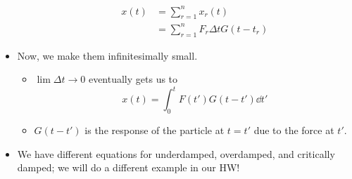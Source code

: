 \documentclass[../notes.tex]{subfiles}
\begin{document}
\begin{itemize}
\begin{itemize}
        \begin{align*}
            x(t) &= \sum_{r=1}^nx_r(t)\\
            &= \sum_{r=1}^nF_r\Delta tG(t-t_r)
        \end{align*}
    \end{itemize}
    \item Now, we make them infinitesimally small.
    \begin{itemize}
        \item $\lim\Delta t\to 0$ eventually gets us to
        \begin{equation*}
            x(t) = \int_0^tF(t')G(t-t')\dd{t'}
        \end{equation*}
        \item $G(t-t')$ is the response of the particle at $t=t'$ due to the force at $t'$.
    \end{itemize}
    \item We have different equations for underdamped, overdamped, and critically damped; we will do a different example in our HW!
\end{itemize}
\end{document}
